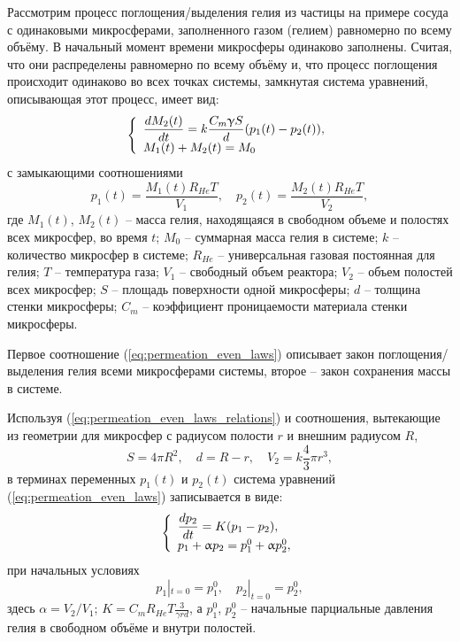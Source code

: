 Рассмотрим процесс поглощения/выделения гелия из частицы на примере сосуда с одинаковыми микросферами, заполненного газом (гелием) равномерно по всему объёму. В начальный момент времени микросферы одинаково заполнены.  Считая, что они распределены равномерно по всему объёму и, что процесс поглощения происходит одинаково во всех точках системы, замкнутая система уравнений, описывающая этот процесс, имеет вид:
\begin{equation}
\left\{
\begin{array}{l}
\label{eq:permeation_even_laws}
\displaystyle\frac{dM_2(t)}{dt}= k\frac{C_m\upgamma S}{d}(p_1(t)-p_2(t)), \\
M_1(t)+M_2(t)=M_0
\end{array}
\right.
\end{equation}
с замыкающими соотношениями
\begin{equation}
\label{eq:permeation_even_laws_relations}
\displaystyle p_1(t) = \frac{M_1(t)R_{He}T}{V_1},\quad p_2(t)=\frac{M_2(t)R_{He}T}{V_2},
\end{equation}
где  $M_1(t)$, $M_2(t)$ -- масса гелия, находящаяся в свободном объеме и полостях всех микросфер, во время $t$; $M_0$ -- суммарная масса гелия в системе; $k$ -- количество микросфер в системе; $R_{He}$ -- универсальная газовая постоянная для гелия; $T$ -- температура газа; $V_1$ -- свободный объем реактора; $V_2$ -- объем  полостей всех микросфер; $S$ -- площадь поверхности одной микросферы; $d$ -- толщина стенки микросферы; $C_m$ -- коэффициент проницаемости материала стенки микросферы. 

Первое соотношение (\ref{eq:permeation_even_laws}) описывает закон поглощения/выделения гелия всеми микросферами системы, второе -- закон сохранения массы в системе. 

Используя  (\ref{eq:permeation_even_laws_relations}) и соотношения, вытекающие из геометрии для микросфер с радиусом полости $r$ и внешним радиусом $R$,
\[
S=4\pi R^2,\quad d=R-r,\quad V_2=k\frac{4}{3}\pi r^3,
\]
в терминах переменных $p_1(t)$ и $p_2(t)$ система уравнений (\ref{eq:permeation_even_laws}) записывается в виде:
\begin{equation}
\label{eq:permeation_even_laws_p} 
\left\{
\begin{array}{l}
\displaystyle \frac{dp_2}{dt}  =  K(p_1-p_2), \\
p_1+\upalpha p_2  =  p_1^0 + \upalpha p_2^0, 
\end{array}
\right.
\end{equation}
при начальных условиях
\begin{equation}
\label{eq:permeation_even_laws_cauchy} p_1|_{t=0}=p_1^0,\quad p_2|_{t=0}=p_2^0,
\end{equation}
здесь $\alpha=V_2/V_1$; $K = C_m R_{He} T\displaystyle\frac{3}{\gamma rd}$, а $p_1^0$, $p_2^0$ -- начальные парциальные давления гелия в свободном объёме и внутри полостей. 

